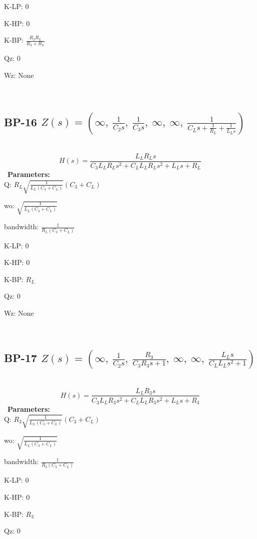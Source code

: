 \documentclass{article}
\begin{document}
K-LP: $0$\ 

K-HP: $0$\ 

K-BP: $\frac{R_{3} R_{L}}{R_{3} + R_{L}}$\ 

Qz: $0$\ 

Wz: $\text{None}$\ 

\ 

\subsection{BP-16 $Z(s) = \left( \infty, \  \frac{1}{C_{2} s}, \  \frac{1}{C_{3} s}, \  \infty, \  \infty, \  \frac{1}{C_{L} s + \frac{1}{R_{L}} + \frac{1}{L_{L} s}}\right)$ } \ 
\textbf{\[H(s) = \frac{L_{L} R_{L} s}{C_{3} L_{L} R_{L} s^{2} + C_{L} L_{L} R_{L} s^{2} + L_{L} s + R_{L}}\] } \ 
\textbf{Parameters:}\\ 

Q: $R_{L} \sqrt{\frac{1}{L_{L} \left(C_{3} + C_{L}\right)}} \left(C_{3} + C_{L}\right)$\ 

wo: $\sqrt{\frac{1}{L_{L} \left(C_{3} + C_{L}\right)}}$\ 

bandwidth: $\frac{1}{R_{L} \left(C_{3} + C_{L}\right)}$\ 

K-LP: $0$\ 

K-HP: $0$\ 

K-BP: $R_{L}$\ 

Qz: $0$\ 

Wz: $\text{None}$\ 

\ 

\subsection{BP-17 $Z(s) = \left( \infty, \  \frac{1}{C_{2} s}, \  \frac{R_{3}}{C_{3} R_{3} s + 1}, \  \infty, \  \infty, \  \frac{L_{L} s}{C_{L} L_{L} s^{2} + 1}\right)$ } \ 
\textbf{\[H(s) = \frac{L_{L} R_{3} s}{C_{3} L_{L} R_{3} s^{2} + C_{L} L_{L} R_{3} s^{2} + L_{L} s + R_{3}}\] } \ 
\textbf{Parameters:}\\ 

Q: $R_{3} \sqrt{\frac{1}{L_{L} \left(C_{3} + C_{L}\right)}} \left(C_{3} + C_{L}\right)$\ 

wo: $\sqrt{\frac{1}{L_{L} \left(C_{3} + C_{L}\right)}}$\ 

bandwidth: $\frac{1}{R_{3} \left(C_{3} + C_{L}\right)}$\ 

K-LP: $0$\ 

K-HP: $0$\ 

K-BP: $R_{3}$\ 

Qz: $0$\ 
\end{document}

